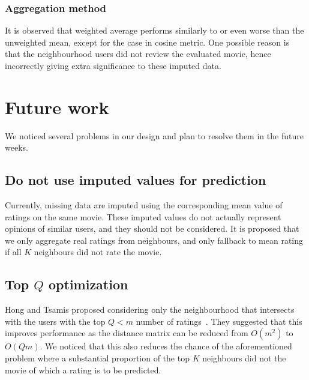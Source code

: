 \documentclass[final]{cvpr}
\begin{document}
\subsubsection{Aggregation method}
It is observed that weighted average performs similarly to or even worse than the unweighted mean,
except for the case in cosine metric.
One possible reason is that the neighbourhood users did not review the evaluated movie,
hence incorrectly giving extra significance to these imputed data.

\section{Future work}
We noticed several problems in our design and plan to resolve them in the future weeks.

\subsection{Do not use imputed values for prediction}
Currently, missing data are imputed using the corresponding mean value of ratings on the same movie.
These imputed values do not actually represent opinions of similar users,
and they should not be considered.
It is proposed that we only aggregate real ratings from neighbours,
and only fallback to mean rating if all $K$ neighbours did not rate the movie.

\subsection{Top $Q$ optimization}
Hong and Tsamis proposed considering only the neighbourhood that
intersects with the users with the top $Q < m$ number of ratings~\cite{Alpher01}.
They suggested that this improves performance as
the distance matrix can be reduced from $O(m^2)$ to $O(Qm)$.
We noticed that this also reduces the chance of the aforementioned problem
where a substantial proportion of the top $K$ neighbours did not the movie
of which a rating is to be predicted.

{\small
	
	
}
\end{document}

